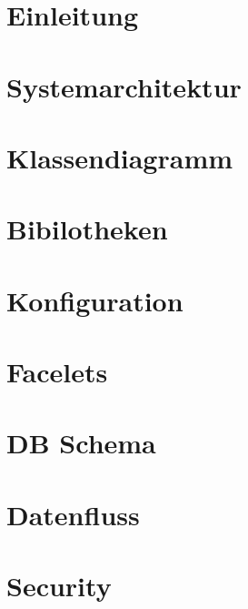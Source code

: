 \documentclass[a4paper,11pt]{article}
\begin{document}

    \tableofcontents


    \newpage

    \section{Einleitung}\label{sec:einleitung}
    

    \section{Systemarchitektur}\label{sec:systemarchitektur}
    

    \section{Klassendiagramm}\label{sec:klassendiagramm}
    

    \section{Bibilotheken}\label{sec:biblithekenn}
    

    \section{Konfiguration}\label{sec:konfiguration}
    

    \section{Facelets}\label{sec:facelets}
    

    \section{DB Schema}\label{sec:dbschema}
    

    \section{Datenfluss}\label{sec:datenfluss}
    

    \section{Security}\label{sec:security}
    
\end{document}
